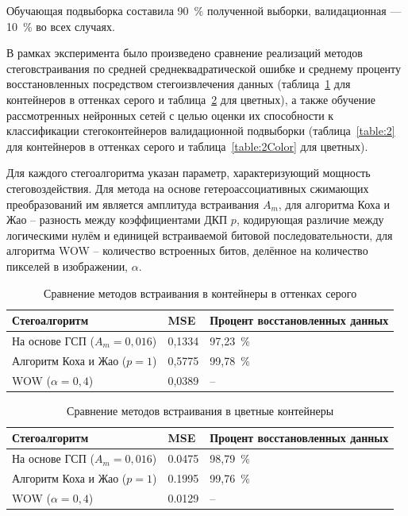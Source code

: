 Обучающая подвыборка составила 90~\% полученной выборки, валидационная --- 10~\% во всех случаях.

В рамках эксперимента было произведено сравнение реализаций методов стеговстраивания по средней среднеквадратической ошибке и среднему проценту восстановленных посредством стегоизвлечения данных (таблица~\ref{table:1} для контейнеров в оттенках серого и таблица~\ref{table:1Color} для цветных), а также обучение рассмотренных нейронных сетей с целью оценки их способности к классификации стегоконтейнеров валидационной подвыборки (таблица~\ref{table:2} для контейнеров в оттенках серого и таблица~\ref{table:2Color} для цветных).

Для каждого стегоалгоритма указан параметр, характеризующий мощность стеговоздействия. Для метода на основе гетероассоциативных сжимающих преобразований им является амплитуда встраивания $ A_m $, для алгоритма Коха и Жао – разность между коэффициентами ДКП $ p $, кодирующая различие между логическими нулём и единицей встраиваемой битовой последовательности, для алгоритма WOW – количество встроенных битов, делённое на количество пикселей в изображении, $ \alpha $.

\begin{table}[h]
\centering
\caption{Сравнение методов встраивания в контейнеры в оттенках серого}
    \begin{tabular}{| l | l | l |}
    \hline
    Стегоалгоритм & MSE & Процент восстановленных данных \\ \hline
    На основе ГСП ($ A_m = 0,016 $) & 0,1334 & 97,23~\% \\ \hline
    Алгоритм Коха и Жао ($ p = 1 $) & 0,5775 & 99,78~\% \\ \hline
    WOW ($ \alpha = 0,4 $) & 0,0389 & – \\ \hline
    \end{tabular}
\label{table:1}
\end{table}

\begin{table}[h]
\centering
    \begin{tabular}{| l | l | l |}
    \hline
    Стегоалгоритм & MSE & Процент восстановленных данных \\ \hline
    На основе ГСП ($ A_m = 0,016 $) & 0.0475 & 98,79~\% \\ \hline
    Алгоритм Коха и Жао ($ p = 1 $) & 0.1995 & 99,76~\% \\ \hline
    WOW ($ \alpha = 0,4 $) & 0.0129 & – \\ \hline
    \end{tabular}
\caption{Сравнение методов встраивания в цветные контейнеры}
\label{table:1Color}
\end{table}

